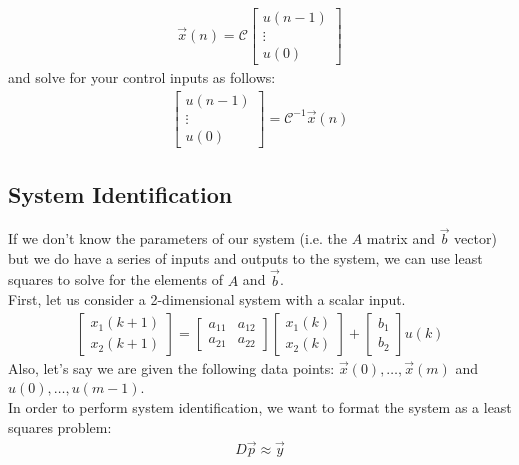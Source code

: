 \begin{align*}
    \vec{x}(n) = \mathcal{C} \begin{bmatrix}
        u(n - 1) \\ \vdots \\ u(0)
    \end{bmatrix}
\end{align*}
and solve for your control inputs as follows:
\begin{align*}
    \begin{bmatrix}
        u(n - 1) \\ \vdots \\ u(0)
    \end{bmatrix} = \boxed{\mathcal{C}^{-1} \vec{x}(n)}
\end{align*}

\subsection*{System Identification}
If we don't know the parameters of our system (i.e. the $A$ matrix and $\vec{b}$ vector) but we do have a series of inputs and outputs to the system, we can use least squares to solve for the elements of $A$ and $\vec{b}$. \\
\newline
First, let us consider a 2-dimensional system with a scalar input.
\begin{align*}
    \begin{bmatrix}
        x_1(k + 1) \\ x_2(k + 1)
    \end{bmatrix} = \begin{bmatrix}
        a_{11} & a_{12} \\
        a_{21} & a_{22}
    \end{bmatrix} \begin{bmatrix}
        x_1(k) \\ x_2(k)
    \end{bmatrix} + \begin{bmatrix}
        b_1 \\ b_2
    \end{bmatrix} u(k)
\end{align*}
Also, let's say we are given the following data points: $\vec{x}(0), \dots, \vec{x}(m)$ and $u(0), \dots, u(m - 1)$. \\
\newline
In order to perform system identification, we want to format the system as a least squares problem:
\begin{align*}
    D\vec{p} \approx \vec{y}
\end{align*}
